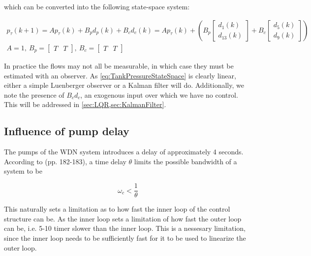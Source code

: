 which can be converted into the following state-space system:

\begin{equation}\label{eq:TankPressureStateSpace}
	\begin{gathered}
				p_\tau(k+1) = A p_\tau(k) + B_pd_p(k) + B_cd_c(k)
				= A p_\tau(k) + \left(B_p \begin{bmatrix}d_1(k) \\ d_{13}(k)\end{bmatrix} 
				+ B_c\begin{bmatrix}d_5(k) \\ d_9(k)\end{bmatrix}\right) \\      
				A = 1, \ B_p = \begin{bmatrix}T & T \end{bmatrix}, \ B_c = \begin{bmatrix}T & T\end{bmatrix}
	\end{gathered}
\end{equation}

In practice the flows may not all be measurable, in which case they must be estimated with an observer. As \cref{eq:TankPressureStateSpace} is clearly linear, either a simple Luenberger observer or a Kalman filter will do. Additionally, we note the presence of $B_cd_c$, an exogenous input over which we have no control. This will be addressed in \cref{sec:LQR,sec:KalmanFilter}.

\subsection{Influence of pump delay}
The pumps of the WDN system introduces a delay of approximately 4 seconds. According to \cite{Skogestad2005} (pp. 182-183), 
a time delay $\theta$ limits the possible bandwidth of a system to be 

\begin{equation}\label{eq:BWdelay}
	\omega_c < \frac{1}{\theta}
\end{equation}

This naturally sets a limitation as to how fast the inner loop of the control structure can be. As the inner loop sets a limitation of how fast the outer loop can be, i.e. 5-10 timer slower than the inner loop. This is a nessesary limitation, since the inner loop needs to be sufficiently fast for it to be used to linearize the outer loop. 



